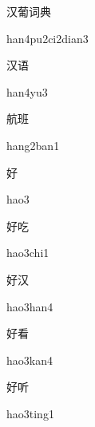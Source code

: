 \begin{verbete}{汉葡词典}
\begin{pronuncia}{han4pu2ci2dian3}
\end{pronuncia}
\end{verbete}

\begin{verbete}[han4yu3]{汉语}
\begin{pronuncia}{han4yu3}
\end{pronuncia}
\end{verbete}

\begin{verbete}{航班}
\begin{pronuncia}{hang2ban1}
\end{pronuncia}
\end{verbete}

\begin{verbete}[hao3]{好}
\begin{pronuncia}{hao3}
\end{pronuncia}
\end{verbete}

\begin{verbete}{好吃}
\begin{pronuncia}{hao3chi1}
\end{pronuncia}
\end{verbete}

\begin{verbete}{好汉}
\begin{pronuncia}{hao3han4}
\end{pronuncia}
\end{verbete}

\begin{verbete}{好看}
\begin{pronuncia}{hao3kan4}
\end{pronuncia}
\end{verbete}

\begin{verbete}{好听}
\begin{pronuncia}{hao3ting1}
\end{pronuncia}
\end{verbete}

